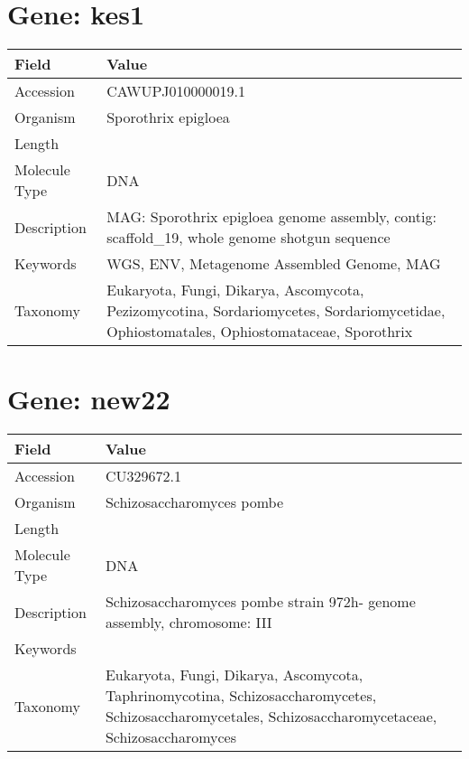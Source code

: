 \documentclass[10pt]{article}
\begin{document}
\vspace{1em}
\section{Gene: kes1}
{\footnotesize
\begin{longtable}{>{\raggedright\arraybackslash}p{4.5cm} >{\raggedright\arraybackslash}p{11.5cm}}
\textbf{Field} & \textbf{Value} \\
\hline
Accession & CAWUPJ010000019.1 \\
Organism & Sporothrix epigloea \\
Length & 122865 \\
Molecule Type & DNA \\
Description & MAG: Sporothrix epigloea genome assembly, contig: scaffold\_19, whole genome shotgun sequence \\
Keywords & WGS, ENV, Metagenome Assembled Genome, MAG \\
Taxonomy & Eukaryota, Fungi, Dikarya, Ascomycota, Pezizomycotina, Sordariomycetes, Sordariomycetidae, Ophiostomatales, Ophiostomataceae, Sporothrix \\
\end{longtable}
}

\vspace{1em}
\section{Gene: new22}
{\footnotesize
\begin{longtable}{>{\raggedright\arraybackslash}p{4.5cm} >{\raggedright\arraybackslash}p{11.5cm}}
\textbf{Field} & \textbf{Value} \\
\hline
Accession & CU329672.1 \\
Organism & Schizosaccharomyces pombe \\
Length & 2452883 \\
Molecule Type & DNA \\
Description & Schizosaccharomyces pombe strain 972h- genome assembly, chromosome: III \\
Keywords &  \\
Taxonomy & Eukaryota, Fungi, Dikarya, Ascomycota, Taphrinomycotina, Schizosaccharomycetes, Schizosaccharomycetales, Schizosaccharomycetaceae, Schizosaccharomyces \\
\end{longtable}
}

\vspace{1em}
\end{document}
